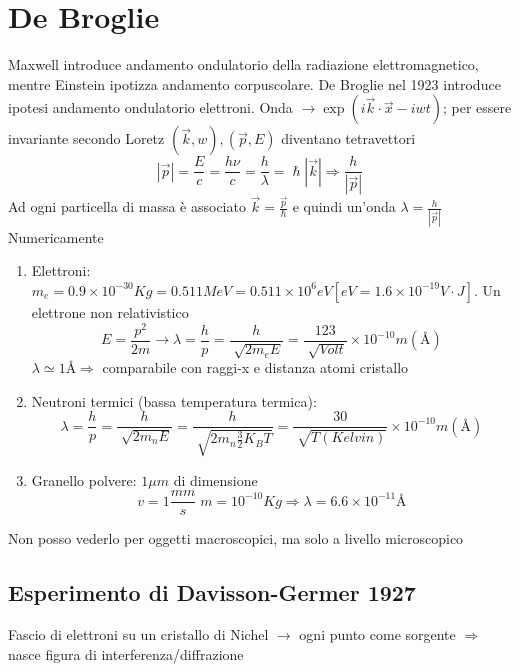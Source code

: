 \documentclass[a4paper,11pt]{report}
\theoremstyle{remark}
\theoremstyle{definition}
\newcommand{\angs}{\text{\AA}}
\begin{document}
\chapter{De Broglie}
Maxwell introduce andamento ondulatorio della radiazione elettromagnetico, mentre Einstein ipotizza andamento corpuscolare. De Broglie nel 1923 introduce ipotesi andamento ondulatorio elettroni. \newline
Onda $\rightarrow \exp(i \vec{k}\cdot \vec{x}- iwt)$; per essere invariante secondo Loretz $(\vec{k},w),(\vec{p},E)$ diventano tetravettori
\begin{equation*}
    |\vec{p}| = \frac{E}{c} = \frac{h\nu}{c} = \frac{h}{\lambda} = \hslash |\vec{k}| \Rightarrow \frac{h}{|\vec{p}|}
\end{equation*}
Ad ogni particella di massa è associato $\vec{k} = \frac{\vec{p}}{\hslash}$ e quindi un'onda $\lambda = \frac{h}{|\vec{p}|}$ \newline
Numericamente
\begin{enumerate}
    \item Elettroni: $m_e = 0.9 \times 10^{-30} Kg = 0.511 MeV = 0.511 \times 10^6 eV [eV = 1.6 \times 10^{-19} V\cdot J]$. Un elettrone non relativistico
    \begin{equation*}
        E = \frac{p^2}{2m} \rightarrow \lambda = \frac{h}{p} = \frac{h}{\sqrt[]{2m_eE}} = \frac{123}{\sqrt[]{Volt}}\times 10^{-10} m (\angs)
    \end{equation*}
    $\lambda \simeq 1 \angs \Rightarrow$ comparabile con raggi-x e distanza atomi cristallo
    \item Neutroni termici (bassa temperatura termica): 
    \begin{equation*}
        \lambda = \frac{h}{p} = \frac{h}{\sqrt[]{2m_nE}} = \frac{h}{\sqrt[]{2m_n \frac{3}{2}K_BT}} =\frac{30}{\sqrt[]{T (Kelvin)}}\times 10^{-10} m (\angs)
    \end{equation*}
    \item Granello polvere: $1\mu m$ di dimensione 
    \begin{equation*}
        v = 1 \frac{mm}{s} \; m = 10^{-10} Kg \Rightarrow \lambda = 6.6 \times 10^{-11} \angs 
    \end{equation*}
\end{enumerate} 
Non posso vederlo per oggetti macroscopici, ma solo a livello microscopico

\section*{Esperimento di Davisson-Germer 1927}
Fascio di elettroni su un cristallo di Nichel $\rightarrow$ ogni punto come sorgente $\Rightarrow$ nasce figura di interferenza/diffrazione 
\end{document}
